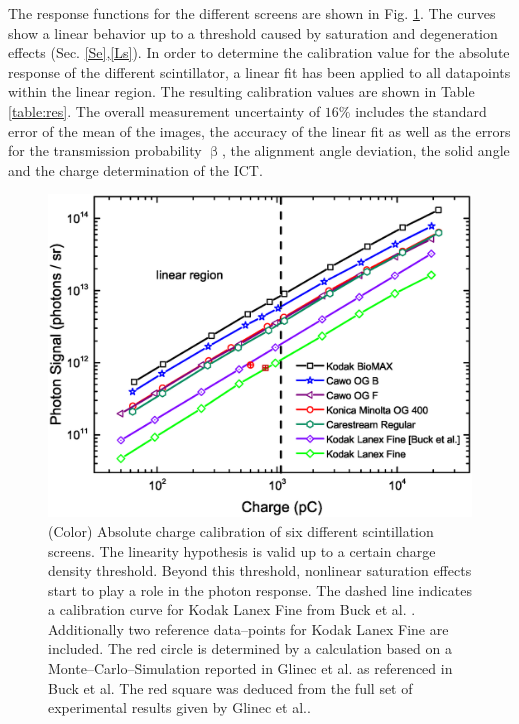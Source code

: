 \documentclass[%
preprint,
amsmath,
amssymb,
aip,
rsi, 
numerical,
floatfix,
]{revtex4-1}
\begin{document}


The response functions for the different screens are shown in Fig. \ref{fig:Calib}.
The curves show a linear behavior up to a threshold caused by saturation and degeneration effects (Sec. \ref{Se},\ref{Ls}).  
In order to determine the calibration value for the absolute response of the different scintillator, a linear fit has been applied to all datapoints within the linear region.
The resulting calibration values are shown in Table \ref{table:res}. 
The overall measurement uncertainty of $16\%$ includes the standard error of the mean of the images, the accuracy of the linear fit as well as the errors for the transmission probability $\upbeta$, the alignment angle deviation, the solid angle and the charge determination of the ICT. 
   
\begin{figure}
\includegraphics[width=\textwidth]{./Figures/Absolute}%
\caption{\label{fig:Calib}(Color) Absolute charge calibration of six different scintillation screens.
The linearity hypothesis is valid up to a certain charge density threshold. 
Beyond this threshold, nonlinear saturation effects start to play a role in the photon response.
The dashed line indicates a calibration curve for Kodak Lanex Fine from Buck et al.\cite{Buck2010} .
Additionally two reference data--points for Kodak Lanex Fine are included. 
The red circle is determined by a calculation based on a Monte--Carlo--Simulation reported in Glinec et al.\cite{Glinec2006} as referenced in Buck et al. 
The red square was deduced from the full set of experimental results given by Glinec et al.. }
\end{figure}
\end{document}
